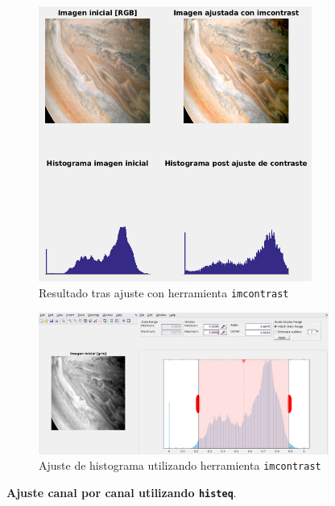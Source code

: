 \documentclass[12pt]{article}
\begin{document}
	\begin{figure}[h]
		\begin{center}
			\includegraphics[width=0.8\textwidth]{img/contrast_imcontrast_2.png}
			\caption{Resultado tras ajuste con herramienta \texttt{imcontrast}}
			\label{img: contrast imcontrast 2}
		\end{center}
	\end{figure}
	
	\pagebreak
	
	\begin{figure}[h]
		\begin{center}
			\includegraphics[width=0.85\textwidth]{img/contrast_imcontrast_1.png}
			\caption{Ajuste de histograma utilizando herramienta \texttt{imcontrast}}
			\label{img: contrast imcontrast 1}
		\end{center}
	\end{figure}

	\noindent \textbf{\large Ajuste canal por canal utilizando \texttt{histeq}}. \\ 
	
\end{document}

